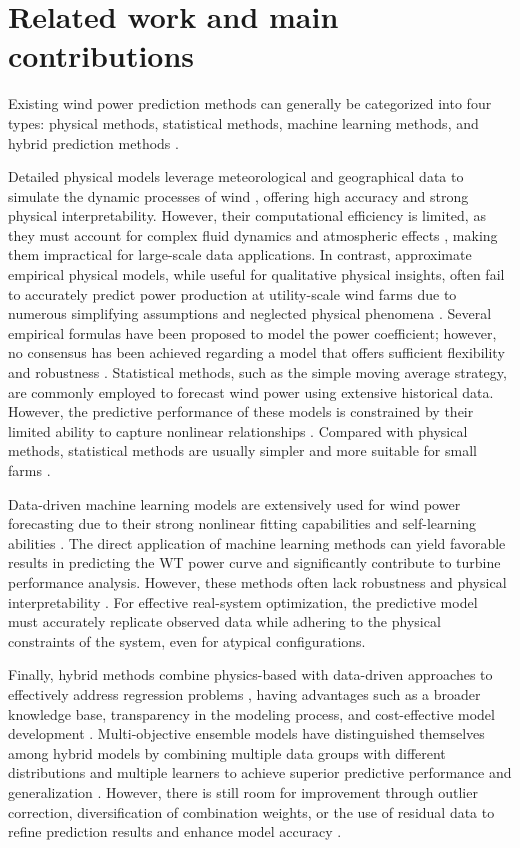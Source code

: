 \section{Related work and main contributions}
\label{sec:related-work}
Existing wind power prediction methods can generally be categorized into four types: physical methods, statistical methods, machine learning methods, and hybrid prediction methods \cite{CHEN2020}.

Detailed physical models leverage meteorological and geographical data to simulate the dynamic processes of wind \cite{CHEN2020}, offering high accuracy and strong physical interpretability. However, their computational efficiency is limited, as they must account for complex fluid dynamics and atmospheric effects \cite{Zehtabiyan2022}, making them impractical for large-scale data applications. In contrast, approximate empirical physical models, while useful for qualitative physical insights, often fail to accurately predict power production at utility-scale wind farms due to numerous simplifying assumptions and neglected physical phenomena \cite{Howland2019}. Several empirical formulas have been proposed to model the power coefficient; however, no consensus has been achieved regarding a model that offers sufficient flexibility and robustness \cite{Carpintero2020,Castillo2023}. Statistical methods, such as the simple moving average strategy, are commonly employed to forecast wind power using extensive historical data. However, the predictive performance of these models is constrained by their limited ability to capture nonlinear relationships \cite{ZHU2019}. Compared with physical methods, statistical methods are usually simpler and more suitable for small farms \cite{LIU2010}.

Data-driven machine learning models are extensively used for wind power forecasting due to their strong nonlinear fitting capabilities and self-learning abilities \cite{Clifton2013,HEINERMANN2016,SUN2020,DEMOLLI2019,MOSS2024,Dhungana2025}. The direct application of machine learning methods can yield favorable results in predicting the WT power curve and significantly contribute to turbine performance analysis. However, these methods often lack robustness and physical interpretability \cite{Wang2023}. For effective real-system optimization, the predictive model must accurately replicate observed data while adhering to the physical constraints of the system, even for atypical configurations.

Finally, hybrid methods combine physics-based with data-driven approaches to effectively address regression problems \cite{Stoffel2022}, having advantages such as a broader knowledge base, transparency in the modeling process, and cost-effective model development \cite{VONSTOSCH2014}. Multi-objective ensemble models have distinguished themselves among hybrid models by combining multiple data groups with different distributions and multiple learners to achieve superior predictive performance and generalization \cite{TASCIKARAOGLU2014,LIU2020}. However, there is still room for improvement through outlier correction, diversification of combination weights, or the use of residual data to refine prediction results and enhance model accuracy \cite{CHEN2022,YIN2022}. 

